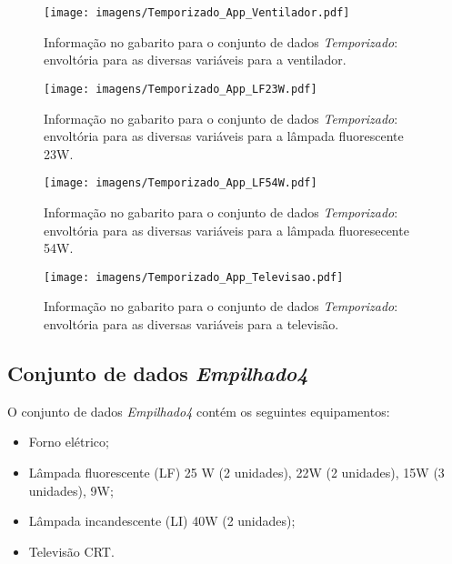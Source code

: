 \begin{sidewaysfigure}[p]
\centering
\texttt{[image: imagens/Temporizado\_App\_Ventilador.pdf]}
\caption{Informação no gabarito para o conjunto de dados
\emph{Temporizado}: envoltória para as diversas variáveis para a
ventilador.}
\label{fig:temporizado_ventilador}
\end{sidewaysfigure}

\begin{sidewaysfigure}[p]
\centering
\texttt{[image: imagens/Temporizado\_App\_LF23W.pdf]}
\caption{Informação no gabarito para o conjunto de dados
\emph{Temporizado}: envoltória para as diversas variáveis para a
lâmpada fluorescente 23W.}
\label{fig:temporizado_lf23}
\end{sidewaysfigure}

\begin{sidewaysfigure}[p]
\centering
\texttt{[image: imagens/Temporizado\_App\_LF54W.pdf]}
\caption{Informação no gabarito para o conjunto de dados
\emph{Temporizado}: envoltória para as diversas variáveis para a
lâmpada fluoresecente 54W.}
\label{fig:temporizado_lf54}
\end{sidewaysfigure}

\begin{sidewaysfigure}[p]
\centering
\texttt{[image: imagens/Temporizado\_App\_Televisao.pdf]}
\caption{Informação no gabarito para o conjunto de dados
\emph{Temporizado}: envoltória para as diversas variáveis para a
televisão.}
\label{fig:temporizado_televisao}
\end{sidewaysfigure}

\FloatBarrier

\subsection{Conjunto de dados \emph{Empilhado4}}
\label{ssec:emp4}

O conjunto de dados \emph{Empilhado4} contém os seguintes
equipamentos:

\begin{itemize}
\item Forno elétrico;
\item Lâmpada fluorescente (LF) 25 W (2 unidades), 22W (2 unidades), 15W (3
unidades), 9W;
\item Lâmpada incandescente (LI) 40W (2 unidades);
\item Televisão CRT.
\end{itemize}

